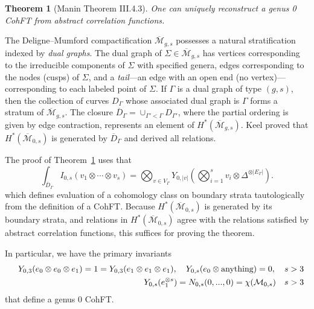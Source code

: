 \documentclass[11pt]{article}
\def\bea{\begin{eqnarray}}
\def\eea{\end{eqnarray}}
\newcommand{\modm}{\mathcal{M}}
\def\bea{\begin{eqnarray}}
\def\eea{\end{eqnarray}}
\theoremstyle{plain}
\newtheorem{theorem}{Theorem}
\theoremstyle{definition}
\def\bea{\begin{eqnarray}}
\def\eea{\end{eqnarray}}
\newcommand{\bc}{\mathbb{C}}
\begin{document}

\begin{theorem}[Manin \cite{ManFro} Theorem III.4.3]   \label{th:manin}
One can uniquely reconstruct a genus 0 CohFT from abstract correlation functions.  
\end{theorem}
The Deligne--Mumford compactification $\overline{\modm}_{g,s}$ possesses a natural stratification indexed by {\em dual graphs}. The dual graph of $\Sigma\in\overline{\modm}_{g,s}$ has vertices corresponding to the irreducible components of $\Sigma$ with specified genera, edges corresponding to the nodes (cusps) of $\Sigma$, and a {\em tail}---an edge with an open end (no vertex)---corresponding to each labeled point of $\Sigma$.  If $\Gamma$ is a dual graph of type $(g,s)$, then the collection of curves $D_{\Gamma}$ whose associated dual graph is $\Gamma$ forms a stratum of $\overline{\modm}_{g,s}$.  The closure $\overline{D}_{\Gamma}=\cup_{\Gamma'<\Gamma}D_{\Gamma'}$, where the partial ordering is given by edge contraction, represents an element of $H^*(\overline{\modm}_{g,s})$.   Keel \cite{KeeInt} proved that $H^*(\overline{\modm}_{0,s})$ is generated by $\overline{D}_{\Gamma}$ and derived all relations.

The proof of Theorem~\ref{th:manin} uses that
$$ 
\int_{\overline{D}_{\Gamma}}I_{0,s}(v_1\otimes\cdots\otimes v_s)=\bigotimes_{v\in V_{\Gamma}}Y_{0,|v|}\left(\bigotimes _{i=1}^s v_i\otimes\Delta^{\otimes |E_{\Gamma}|}\right).
$$
which defines evaluation of a cohomology class on boundary strata tautologically from the definition of a CohFT.  Because $H^*(\overline{\modm}_{0,s})$ is generated by its boundary strata, and relations in $H^*(\overline{\modm}_{0,s})$ agree with the relations satisfied by abstract correlation functions, this suffices for proving the theorem.

In particular, we have the primary invariants 
\bea
&{}&Y_{0,3}(e_0\otimes e_0\otimes e_1)=1=Y_{0,3}(e_1\otimes e_1\otimes e_1), \quad Y_{0,s}(e_0\otimes \hbox{anything})=0,\quad 
s>3\nonumber\\
&{}&Y_{0,s}(e_1^{\otimes s})=N_{0,s}(0,...,0)=\chi(\modm_{0,s})\quad s>3
\eea
that define a genus 0 CohFT.  
\end{document}
